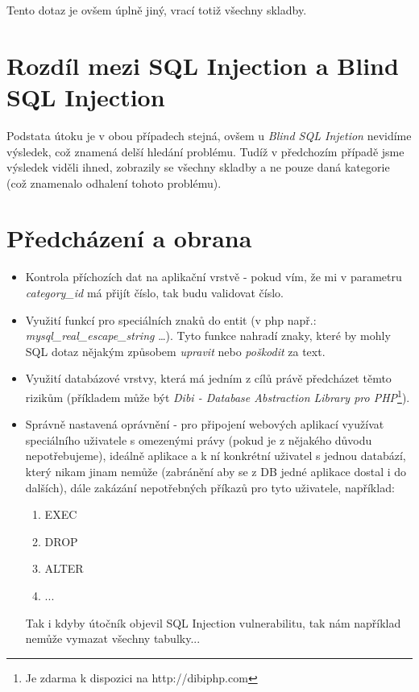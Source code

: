 \documentclass[12pt, a4paper]{report}
\begin{document}
Tento dotaz je ovšem úplně jiný, vrací totiž všechny skladby.

\section{Rozdíl mezi SQL Injection a Blind SQL Injection}
Podstata útoku je v obou případech stejná, ovšem u \textit{Blind SQL Injetion} nevidíme výsledek, což znamená delší hledání problému. Tudíž v předchozím případě jsme výsledek viděli ihned, zobrazily se všechny skladby a ne pouze daná kategorie (což znamenalo odhalení tohoto problému). 

\section{Předcházení a obrana}
\begin{itemize}
\item Kontrola příchozích dat na aplikační vrstvě - pokud vím, že mi v parametru \textit{category\_id} má přijít číslo, tak budu validovat číslo.
\item Využití funkcí pro  speciálních znaků do entit (v php např.: \textit{mysql\_real\_escape\_string} \ldots). Tyto funkce nahradí znaky, které by mohly SQL dotaz nějakým způsobem \textit{upravit} nebo \textit{poškodit} za text.
\item Využití databázové vrstvy, která má jedním z cílů právě předcházet těmto rizikům (příkladem může být \textit{Dibi - Database Abstraction Library pro PHP}\footnote{Je zdarma k dispozici na http://dibiphp.com}).
\item Správně nastavená oprávnění - pro připojení webových aplikací využívat speciálního uživatele s omezenými právy (pokud je z nějakého důvodu nepotřebujeme), ideálně aplikace a k ní konkrétní uživatel s jednou databází, který nikam jinam nemůže (zabránění aby se z DB jedné aplikace dostal i do dalších), dále zakázání nepotřebných příkazů pro tyto uživatele, například:
\begin{enumerate}
\item EXEC
\item DROP
\item ALTER
\item ...
\end{enumerate}
Tak i kdyby útočník objevil SQL Injection vulnerabilitu, tak nám například nemůže vymazat všechny tabulky...
\end{itemize}


\end{document}
